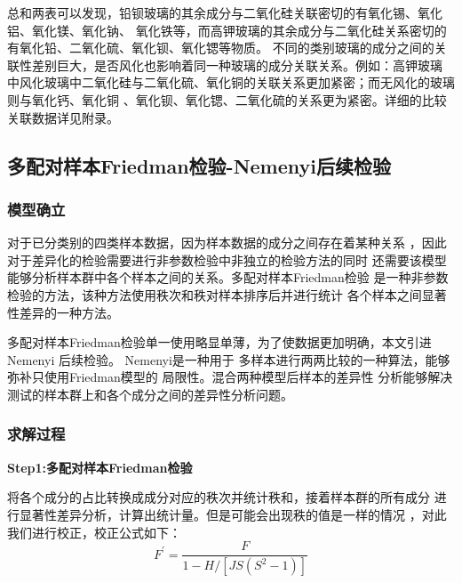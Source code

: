 \documentclass[UTF8]{ctexart}
\begin{document}

总和两表可以发现，铅钡玻璃的其余成分与二氧化硅关联密切的有氧化锡、氧化铝、氧化镁、氧化钠、
氧化铁等，而高钾玻璃的其余成分与二氧化硅关系密切的有氧化铅、二氧化硫、氧化钡、氧化锶等物质。
不同的类别玻璃的成分之间的关联性差别巨大，是否风化也影响着同一种玻璃的成分关联关系。例如：高钾玻璃
中风化玻璃中二氧化硅与二氧化硫、氧化铜的关联关系更加紧密；而无风化的玻璃则与氧化钙、氧化铜
、氧化钡、氧化锶、二氧化硫的关系更为紧密。详细的比较关联数据详见附录。


\subsection{多配对样本Friedman检验-Nemenyi后续检验}
\subsubsection{模型确立}
对于已分类别的四类样本数据，因为样本数据的成分之间存在着某种关系
，因此对于差异化的检验需要进行非参数检验中非独立的检验方法的同时
还需要该模型能够分析样本群中各个样本之间的关系。多配对样本Friedman检验
是一种非参数检验的方法，该种方法使用秩次和秩对样本排序后并进行统计
各个样本之间显著性差异的一种方法。

多配对样本Friedman检验单一使用略显单薄，为了使数据更加明确，本文引进Nemenyi 后续检验。
Nemenyi是一种用于
多样本进行两两比较的一种算法，能够弥补只使用Friedman模型的
局限性。混合两种模型后样本的差异性
分析能够解决测试的样本群上和各个成分之间的差异性分析问题。

\subsubsection{求解过程}
\textbf{Step1:多配对样本Friedman检验}

将各个成分的占比转换成成分对应的秩次并统计秩和，接着样本群的所有成分
进行显著性差异分析，计算出统计量。但是可能会出现秩的值是一样的情况
，对此我们进行校正，校正公式如下：
\begin{equation}
    F^{\prime}=\frac{F}{1-H /\left[JS\left(S^{2}-1\right)\right]}
\end{equation}
\end{document}

